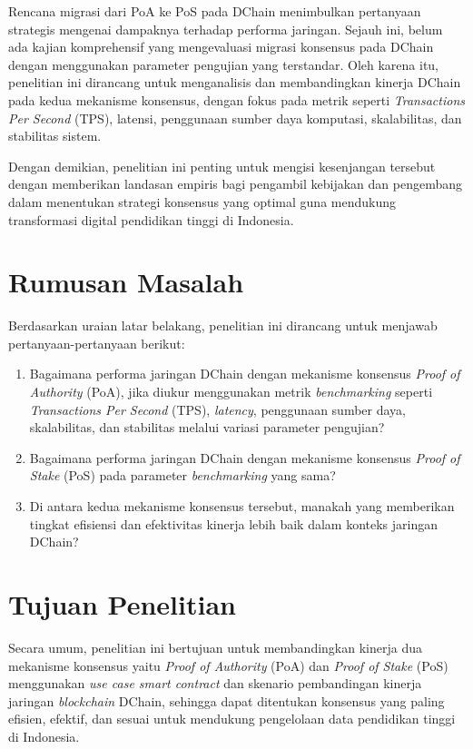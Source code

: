 Rencana migrasi dari PoA ke PoS pada DChain menimbulkan pertanyaan strategis mengenai dampaknya terhadap performa jaringan. Sejauh ini, belum ada kajian komprehensif yang mengevaluasi migrasi konsensus pada DChain dengan menggunakan parameter pengujian yang terstandar. Oleh karena itu, penelitian ini dirancang untuk menganalisis dan membandingkan kinerja DChain pada kedua mekanisme konsensus, dengan fokus pada metrik seperti \textit{Transactions Per Second} (TPS), latensi, penggunaan sumber daya komputasi, skalabilitas, dan stabilitas sistem.

Dengan demikian, penelitian ini penting untuk mengisi kesenjangan tersebut dengan memberikan landasan empiris bagi pengambil kebijakan dan pengembang dalam menentukan strategi konsensus yang optimal guna mendukung transformasi digital pendidikan tinggi di Indonesia.

\section{Rumusan Masalah}

Berdasarkan uraian latar belakang, penelitian ini dirancang untuk menjawab pertanyaan-pertanyaan berikut:

\begin{enumerate}
    \item Bagaimana performa jaringan DChain dengan mekanisme konsensus \textit{Proof of Authority} (PoA), jika diukur menggunakan metrik \textit{benchmarking} seperti \textit{Transactions Per Second} (TPS), \textit{latency}, penggunaan sumber daya, skalabilitas, dan stabilitas melalui variasi parameter pengujian?
    \item Bagaimana performa jaringan DChain dengan mekanisme konsensus \textit{Proof of Stake} (PoS) pada parameter \textit{benchmarking} yang sama?
    \item Di antara kedua mekanisme konsensus tersebut, manakah yang memberikan tingkat efisiensi dan efektivitas kinerja lebih baik dalam konteks jaringan DChain?
\end{enumerate}

\section{Tujuan Penelitian}

Secara umum, penelitian ini bertujuan untuk membandingkan kinerja dua mekanisme konsensus yaitu \textit{Proof of Authority} (PoA) dan \textit{Proof of Stake} (PoS) menggunakan \textit{use case smart contract} dan skenario pembandingan kinerja jaringan \textit{blockchain} DChain, sehingga dapat ditentukan konsensus yang paling efisien, efektif, dan sesuai untuk mendukung pengelolaan data pendidikan tinggi di Indonesia.

